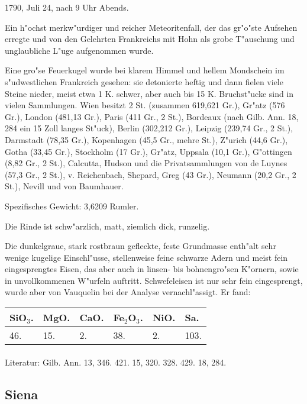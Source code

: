 \documentclass[a4paper, 11pt, oneside]{article}
\begin{document}
1790, Juli 24, nach 9 Uhr Abends.

Ein h"ochst merkw"urdiger und reicher Meteoritenfall, der das gr"o"ste Aufsehen erregte und von den Gelehrten Frankreichs mit Hohn als grobe T"auschung und unglaubliche L"uge aufgenommen wurde.

Eine gro"se Feuerkugel wurde bei klarem Himmel und hellem Mondschein im s"udwestlichen Frankreich gesehen: sie detonierte heftig und dann fielen viele Steine nieder, meist etwa 1 K. schwer, aber auch bis 15 K. Bruchst"ucke sind in vielen Sammlungen. Wien besitzt 2 St. (zusammen 619,621 Gr.), Gr"atz (576 Gr.), London (481,13 Gr.), Paris (411 Gr., 2 St.), Bordeaux (nach Gilb. Ann. 18, 284 ein 15 Zoll langes St"uck), Berlin (302,212 Gr.), Leipzig (239,74 Gr., 2 St.), Darmstadt (78,35 Gr.), Kopenhagen (45,5 Gr., mehre St.), Z"urich (44,6 Gr.), Gotha (33,45 Gr.), Stockholm (17 Gr.), Gr"atz, Uppsala (10,1 Gr.), G"ottingen (8,82 Gr., 2 St.), Calcutta, Hudson und die Privatsammlungen von de Luynes (57,3 Gr., 2 St.), v. Reichenbach, Shepard, Greg (43 Gr.), Neumann (20,2 Gr., 2 St.), Nevill und von Baumhauer.

Spezifisches Gewicht: 3,6209 Rumler.

Die Rinde ist schw"arzlich, matt, ziemlich dick, runzelig.

Die dunkelgraue, stark rostbraun gefleckte, feste Grundmasse enth"alt sehr wenige kugelige Einschl"usse, stellenweise feine schwarze Adern und meist fein eingesprengtes Eisen, das aber auch in linsen- bis bohnengro"sen K"ornern, sowie in unvollkommenen W"urfeln auftritt. Schwefeleisen ist nur sehr fein eingesprengt, wurde aber von Vauquelin bei der Analyse vernachl"assigt. Er fand:
\begin{table}[!ht]
    \centering
    \begin{tabular}{l l l l l l}
        SiO$_{3}$. & MgO. & CaO. & Fe$_{2}$O$_{3}$. & NiO. & Sa. \\ \hline
        46. & 15. & 2. & 38. & 2. & 103. \\
    \end{tabular}
\end{table}
\footnotesize
\paragraph{}
Literatur: Gilb. Ann. 13, 346. 421. 15, 320. 328. 429. 18, 284.
\subsection{Siena}
\normalsize
\end{document}
